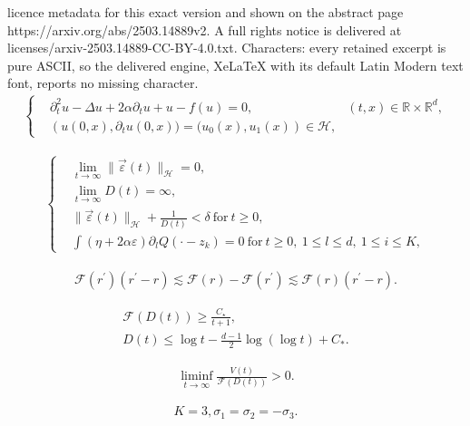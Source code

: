 \documentclass[10pt,a4paper]{amsart}
\renewcommand{\r}{\right}
\begin{document}
licence metadata for this exact version and shown on the abstract page https://arxiv.org/abs/2503.14889v2. A full rights notice is delivered at licenses/arxiv-2503.14889-CC-BY-4.0.txt. Characters: every retained excerpt is pure ASCII, so the delivered engine, XeLaTeX with its default Latin Modern text font, reports no missing character.
\begin{align}
\label{DNKG}
\tag{DNKG}
	\left\{
	\begin{aligned}
		&\partial_{t}^2u-\Delta u+2\alpha \partial_{t}u+u-f(u)=0, & (t,x) \in \mathbb{R} \times \mathbb{R}^d,
		\\
		&\left(u(0,x),{\partial}_tu(0,x))=(u_{0}(x), u_1(x)\right)\in \mathcal{H},
	\end{aligned}
	\r.
\end{align}

\begin{align}\label{sa}
\left\{
\begin{aligned}
&\lim_{t\to \infty}\|\vec{\varepsilon}(t)\|_{\mathcal{H}}=0,
\\
&\lim_{t\to \infty}D(t)=\infty,
\\
&\|\vec{\varepsilon}(t)\|_{\mathcal{H}}+\frac{1}{D(t)}<\delta\ \mbox{for}\ t\geq 0,
\\
&\int (\eta+2\alpha \varepsilon){\partial}_lQ(\cdot-z_k)=0\  \mbox{for}\ t\geq 0,\ 1\leq l\leq d,\ 1\leq i\leq K,
\end{aligned}
\r.
\end{align}

\begin{align}\label{Fesb}
\mathcal{F}(r^{\prime})(r^{\prime}-r)\lesssim\mathcal{F}(r)-\mathcal{F}(r^{\prime})\lesssim \mathcal{F}(r)(r^{\prime}-r).
\end{align}

\begin{align}
\mathcal{F}(D(t))\geq \frac{C_{\star}}{t+1}, \label{mathcalFes}
\\
D(t)\leq \log{t}-\frac{d-1}{2}\log{(\log{t})}+C_{\ast}. \label{Des}
\end{align}

\begin{align}\label{Vrep}
\liminf_{t\to \infty}\frac{V(t)}{\mathcal{F}(D(t))}> 0.
\end{align}

\begin{align}\label{3soliass}
K=3, \sigma_1=\sigma_2=-\sigma_3.
\end{align}
\end{document}
